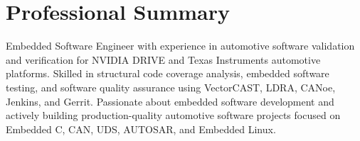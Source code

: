 \section{Professional Summary}

Embedded Software Engineer with experience in automotive software validation and verification for NVIDIA DRIVE and Texas Instruments automotive platforms. Skilled in structural code coverage analysis, embedded software testing, and software quality assurance using VectorCAST, LDRA, CANoe, Jenkins, and Gerrit. Passionate about embedded software development and actively building production-quality automotive software projects focused on Embedded C, CAN, UDS, AUTOSAR, and Embedded Linux.